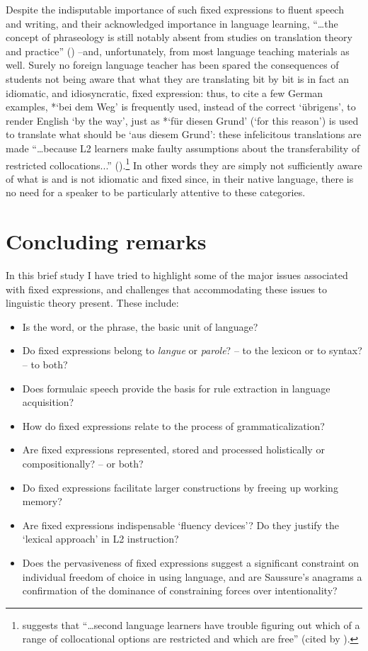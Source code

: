 \documentclass[output=paper]{langsci/langscibook}
\begin{document}
Despite the indisputable importance of such fixed expressions to fluent speech and writing, and their acknowledged importance in language learning, “…the concept of phraseology is still notably absent from studies on translation theory and practice” (\citealt[xxiv]{granger_phraseology:_2008}) –and, unfortunately, from most language teaching materials as well. Surely no foreign language teacher has been spared the consequences of students not being aware that what they are translating bit by bit is in fact an idiomatic, and idiosyncratic, fixed expression: thus, to cite a few German examples, *‘bei dem  Weg’ is frequently used, instead of the correct ‘übrigens’, to render English ‘by the way’, just as *‘für diesen Grund’ (‘for this reason’) is used to translate what should be ‘aus diesem Grund’: these infelicitous translations are made “…because L2 learners make faulty assumptions about the transferability of restricted collocations...” (\citealt[833]{kim_frequency_2012}).\footnote{ \textrm{\citet[34]{howarth_phraseology_1998} suggests that “…second language learners have trouble figuring out which of a range of collocational options are restricted and which are free” (cited by \citealt[833]{kim_frequency_2012}).}} In other words they are simply not sufficiently aware of what is and is not idiomatic and fixed since, in their native language, there is no need for a speaker to be particularly attentive to these categories.

\section{Concluding remarks}
In this brief study I have tried to highlight some of the major issues associated with fixed expressions, and challenges that accommodating these issues to linguistic theory present. These include:

\begin{itemize}
\item Is the word, or the phrase, the basic unit of language?
\item Do fixed expressions belong to \textit{langue} or \textit{parole}? – to the lexicon or to syntax? – to both? 
\item Does formulaic speech provide the basis for rule extraction in language acquisition?
\item How do fixed expressions relate to the process of grammaticalization?
\item Are fixed expressions represented, stored and processed holistically or compositionally? – or both?
\item Do fixed expressions facilitate larger constructions by freeing up working memory?
\item Are fixed expressions indispensable ‘fluency devices’? Do they justify the ‘lexical approach’ in L2 instruction?
\item Does the pervasiveness of fixed expressions suggest a significant constraint on individual freedom of choice in using language, and are Saussure’s anagrams a confirmation of the dominance of constraining forces over intentionality?
\end{itemize}
\end{document}
